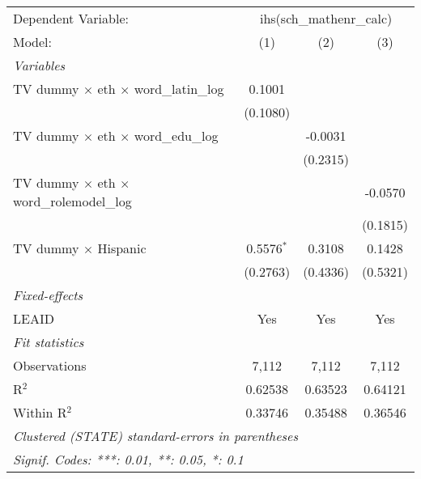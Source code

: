 \begin{tabular}{lccc}
\tabularnewline\midrule\midrule
Dependent Variable:&\multicolumn{3}{c}{ihs(sch\_mathenr\_calc)}\\
Model:&(1) & (2) & (3)\\
\midrule \emph{Variables}&   &   &  \\
TV dummy $\times $ eth $\times $ word\_latin\_log & 0.1001 &    &   \\
  &(0.1080) &    &   \\
TV dummy $\times $ eth $\times $ word\_edu\_log &    & -0.0031 &   \\
  &   & (0.2315) &   \\
TV dummy $\times $ eth $\times $ word\_rolemodel\_log &    &    & -0.0570\\
  &   &    & (0.1815)\\
TV dummy $\times$ Hispanic & 0.5576$^{*}$ & 0.3108 & 0.1428\\
  &(0.2763) & (0.4336) & (0.5321)\\
\midrule \emph{Fixed-effects}&   &   &  \\
LEAID & Yes & Yes & Yes\\
\midrule \emph{Fit statistics}&  & & \\
Observations & 7,112&7,112&7,112\\
R$^2$ & 0.62538&0.63523&0.64121\\
Within R$^2$ & 0.33746&0.35488&0.36546\\
\midrule\midrule\multicolumn{4}{l}{\emph{Clustered (STATE) standard-errors in parentheses}}\\
\multicolumn{4}{l}{\emph{Signif. Codes: ***: 0.01, **: 0.05, *: 0.1}}\\
\end{tabular}


